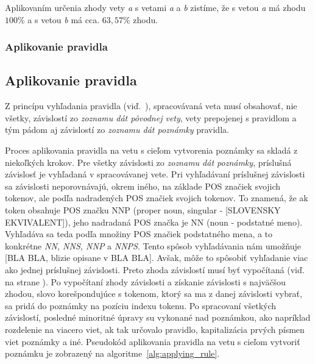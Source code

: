 Aplikovaním určenia zhody vety \textit{a} s vetami \textit{a} a \textit{b} zistíme, že s vetou \textit{a} má zhodu $100\%$ a s vetou \textit{b} má cca. $63,57\%$ zhodu.


%
%
{
	\subsubsection{Aplikovanie pravidla}
}
{
	\subsection{Aplikovanie pravidla}
}
\label{subsubsection:rule_application}

Z princípu vyhľadania pravidla (viď.~), spracovávaná veta musí obsahovať, nie všetky, závislostí zo \textit{zoznamu dát pôvodnej vety}, vety prepojenej s pravidlom a tým pádom aj závislostí zo \textit{zoznamu dát poznámky} pravidla.

Proces aplikovania pravidla na vetu s cieľom vytvorenia poznámky sa skladá z niekoľkých krokov. Pre všetky závislosti zo \textit{zoznamu dát poznámky}, príslušná závislosť je vyhľadaná v spracovávanej vete. Pri vyhľadávaní príslušnej závislosti sa závislosti neporovnávajú, okrem iného, na základe POS značiek svojich tokenov, ale podľa nadradených POS značiek svojich tokenov. To znamená, že ak token obsahuje POS značku NNP (proper noun, singular - [SLOVENSKY EKVIVALENT]), jeho nadradaná POS značka je NN (noun - podstatné meno). Vyhľadáva sa teda podľa množiny POS značiek podstatného mena, a to konkrétne \textit{NN, NNS, NNP} a \textit{NNPS}. Tento spôsob vyhľadávania nám umožňuje [BLA BLA, blizie opisane v BLA BLA]. Avšak, môže to spôsobiť vyhľadanie viac ako jednej príslušnej závislosti. Preto zhoda závislostí musí byť vypočítaná (viď.~ na strane \pageref{paragraph:dependency_match}). Po vypočítaní zhody závislosti a získanie závislosti s najväčšou zhodou, slovo korešpondujúce s tokenom, ktorý sa ma z danej závislosti vybrať, sa pridá do poznámky na pozíciu indexu tokenu. Po spracovaní všetkých závislostí, posledné minoritné úpravy su vykonané nad poznámkou, ako napríklad rozdelenie na viacero viet, ak tak určovalo pravidlo, kapitalizácia prvých písmen viet poznámky a iné. Pseudokód aplikovania pravidla na vetu s cieľom vytvoriť poznámku je zobrazený na algoritme~\ref{alg:applying_rule}.

